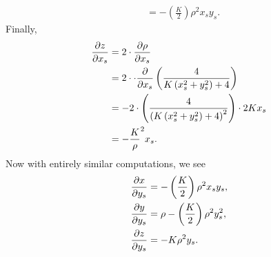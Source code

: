 \documentclass[newpage,hints,handout]{ximera}
\begin{document}
\begin{problem}
\begin{freeResponse}
\begin{align*}
      &= -\left(\frac{K}{2}\right)\rho^2x_sy_s.
      \end{align*}
      Finally,
      \begin{align*}
      \pp[z]{x_s} &= 2\cdot\pp[\rho]{x_s}\\
      &= 2\cdot\cdot \pp{x_s}\left(\frac{4}{K\left(x_s^2 + y_s^2\right) + 4}\right)\\
      &= - 2\cdot \left(\frac{4}{\left(K\left(x_s^2 + y_s^2\right) + 4\right)^{2}}\right)\cdot2Kx_s \\
      &= -\frac{K}\rho^2x_s.
      \end{align*}
      Now with entirely similar computations, we see
      \begin{align*}
        \pp[x]{y_s} &= -\left(\frac{K}{2}\right)\rho^2x_sy_s,\\
        \pp[y]{y_s} &=\rho-\left(\frac{K}{2}\right)\rho^2y_s^2,\\
        \pp[z]{y_s} &= -K\rho^2y_s.       
      \end{align*}
  \end{freeResponse}
\end{problem}
\end{document}
